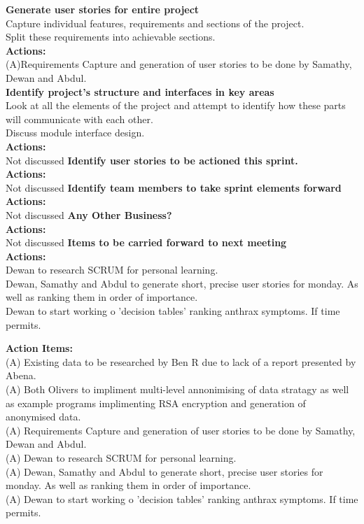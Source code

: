 \documentclass[a4wide,10pt]{extarticle}
\begin{document}
{{\large \textbf{Generate user stories for entire project\\}}
Capture individual features, requirements and sections of the project. \\ 
Split these requirements into achievable sections.\\
\textbf{Actions:\\}
(A)Requirements Capture and generation of user stories to be done by Samathy, Dewan and Abdul.\\
{\large \textbf{Identify project's structure and interfaces in key areas\\}}
Look at all the elements of the project and attempt to identify how these parts will communicate with each other.\\
Discuss module interface design.\\
\textbf{Actions:\\}
Not discussed
\hfill \break
{\large \textbf{Identify user stories to be actioned this sprint.\\}}
\textbf{Actions:\\}
Not discussed
\hfill \break
{\large \textbf{Identify team members to take sprint elements forward\\}}
\textbf{Actions:\\}
Not discussed
\hfill \break
{\large \textbf{Any Other Business?\\}}
\textbf{Actions:\\}
Not discussed
\hfill \break
{\large \textbf{Items to be carried forward to next meeting\\}}
\textbf{Actions:\\}
Dewan to research SCRUM for personal learning.\\
Dewan, Samathy and Abdul to generate short, precise user stories for monday. As well as ranking them in order of importance.\\
Dewan to start working o 'decision tables' ranking anthrax symptoms. If time permits.\\

\hfill \break
\hfill \break

{\large \textbf{Action Items:\\}}
(A) Existing data to be researched by Ben R due to lack of a report presented by Abena.\\
(A) Both Olivers to impliment multi-level annonimising of data stratagy as well as example programs implimenting RSA encryption and generation of anonymised data.\\
(A) Requirements Capture and generation of user stories to be done by Samathy, Dewan and Abdul.\\
(A) Dewan to research SCRUM for personal learning.\\
(A) Dewan, Samathy and Abdul to generate short, precise user stories for monday. As well as ranking them in order of importance.\\
(A) Dewan to start working o 'decision tables' ranking anthrax symptoms. If time permits.\\



\subsection*{\color{red}{Next Meeting:Thursday Febuary 25th 2016}}

}
\end{document}
